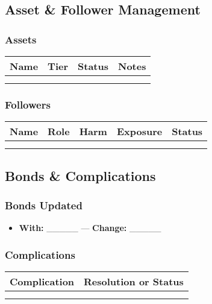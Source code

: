 \subsection{Asset \& Follower Management}
\subsubsection*{Assets}
\begin{tabular}{|p{4cm}|p{2cm}|p{2cm}|p{2.2cm}|}
\hline
\textbf{Name} & \textbf{Tier} & \textbf{Status} & \textbf{Notes} \\
\hline
 & & & \\
 & & & \\
\hline
\end{tabular}

\subsubsection*{Followers}
\begin{tabular}{|p{3.2cm}|p{2cm}|p{1.4cm}|p{1.6cm}|p{2cm}|}
\hline
\textbf{Name} & \textbf{Role} & \textbf{Harm} & \textbf{Exposure} & \textbf{Status} \\
\hline
 & & & & \\
 & & & & \\
\hline
\end{tabular}

\subsection{Bonds \& Complications}
\subsubsection*{Bonds Updated}
\begin{itemize}
  \item \textbf{With:} \_\_\_\_\_ — \textbf{Change:} \_\_\_\_\_
\end{itemize}
\subsubsection*{Complications}
\begin{tabular}{|p{5cm}|p{5cm}|}
\hline
\textbf{Complication} & \textbf{Resolution or Status} \\
\hline
 &  \\
 &  \\
\hline
\end{tabular}

